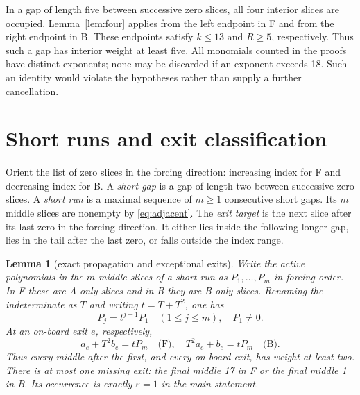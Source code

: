 \documentclass{article}
\newtheorem{lemma}{Lemma}
\begin{document}
In a gap of length five between successive zero slices, all four interior slices are occupied.
Lemma~\ref{lem:four} applies from the left endpoint in F and from the right endpoint in B. These
endpoints satisfy \(k \le 13\) and \(R \ge 5\), respectively. Thus such a gap has interior weight
at least five. All monomials counted in the proofs have distinct exponents; none may be discarded
if an exponent exceeds 18. Such an identity would violate the hypotheses rather than supply a
further cancellation.

\section{Short runs and exit classification}\label{sec:runs}

Orient the list of zero slices in the forcing direction: increasing index for F and decreasing
index for B. A \emph{short gap} is a gap of length two between successive zero slices. A
\emph{short run} is a maximal sequence of \(m \ge 1\) consecutive short gaps. Its \(m\) middle
slices are nonempty by \eqref{eq:adjacent}. The \emph{exit target} is the next slice after its
last zero in the forcing direction. It either lies inside the following longer gap, lies in the
tail after the last zero, or falls outside the index range.

\begin{lemma}[exact propagation and exceptional exits]\label{lem:propagation}
  Write the active polynomials in the \(m\) middle slices of a short run as
  \(P_1, \dots, P_m\) in forcing order. In F these are A-only slices and in B they are B-only
  slices. Renaming the indeterminate as \(T\) and writing \(t = T + T^2\), one has
  \begin{equation}\label{eq:run-powers}
    P_j = t^{j-1} P_1 \quad (1 \le j \le m), \quad P_1 \ne 0.
  \end{equation}
  At an on-board exit \(e\), respectively,
  \begin{equation}\label{eq:exit-feed}
    a_e + T^2 b_e = t P_m \quad \text{(F)}, \quad
    T^2 a_e + b_e = t P_m \quad \text{(B)}.
  \end{equation}
  Thus every middle after the first, and every on-board exit, has weight at least two. There is
  at most one missing exit: the final middle 17 in F or the final middle 1 in B. Its occurrence is
  exactly \(\varepsilon = 1\) in the main statement.
\end{lemma}
\end{document}
